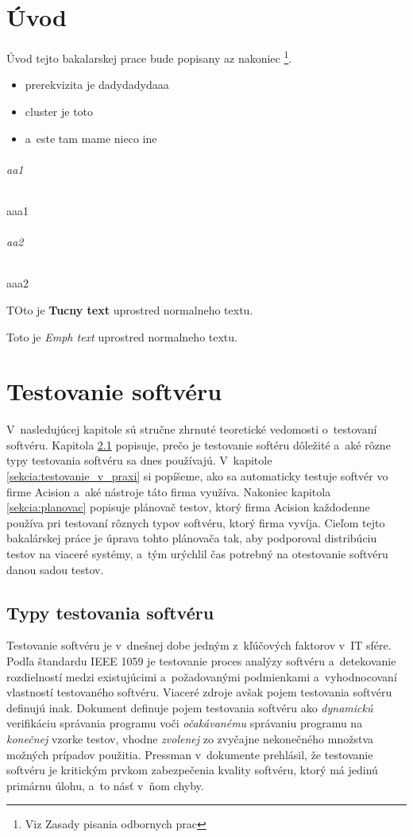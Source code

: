 
\chapter{Úvod}
Úvod tejto bakalarskej prace bude popisany az nakoniec \footnote{Viz Zasady pisania odbornych prac}.

\begin{itemize}
\item prerekvizita je dadydadydaaa
\item cluster je toto
\item a~este tam mame nieco ine
\end{itemize}

\subparagraph{aa1}
aaa1
\subparagraph{aa2}
aaa2

TOto je \textbf{Tucny text} uprostred  normalneho textu.

Toto je \emph{Emph text} uprostred normalneho textu.

\chapter{Testovanie softvéru}
V~nasledujúcej kapitole sú stručne zhrnuté teoretické vedomosti o~testovaní softvéru.
Kapitola \ref{sekcia:typy_testovania} popisuje, prečo je testovanie softéru dôležité a~aké rôzne typy
testovania softvéru sa dnes používajú.
V~kapitole \ref{sekcia:testovanie_v_praxi} si popíšeme, ako sa automaticky testuje softvér vo firme Acision a~aké nástroje táto firma využíva.
Nakoniec kapitola \ref{sekcia:planovac} popisuje plánovač testov, ktorý firma Acision každodenne používa 
pri testovaní rôznych typov softvéru, ktorý firma vyvíja. 
Cieľom tejto bakalárskej práce je úprava tohto plánovača tak, aby podporoval distribúciu testov na viaceré systémy,
a~tým urýchlil čas potrebný na otestovanie softvéru danou sadou testov. 

\section{Typy testovania softvéru} \label{sekcia:typy_testovania}
Testovanie softvéru je v~dnešnej dobe jedným z~kľúčových faktorov v~IT sfére.
Podľa štandardu IEEE 1059 \cite{Ieee} je testovanie proces analýzy softvéru a~detekovanie rozdielností medzi 
existujúcimi a~požadovanými podmienkami a~vyhodnocovaní vlastností testovaného softvéru.
Viaceré zdroje avšak pojem testovania softvéru definujú inak.
Dokument \cite{Swebok} definuje pojem testovania softvéru ako {\it dynamickú} verifikáciu správania programu voči {\it očakávanému} správaniu programu na {\it konečnej} vzorke
testov, vhodne {\it zvolenej} zo zvyčajne nekonečného množstva možných prípadov použitia.
Pressman v~dokumente \cite{Pressman} prehlásil, že testovanie softvéru je kritickým prvkom zabezpečenia kvality softvéru, ktorý má jedinú primárnu úlohu, a~to násť v~ňom chyby.  

